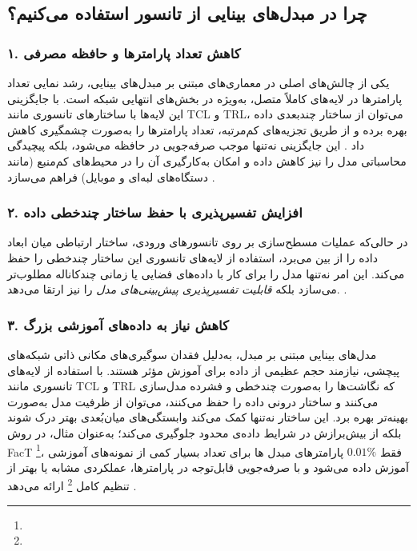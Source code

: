 \subsection{چرا در مبدل‌های بینایی از تانسور استفاده می‌کنیم؟}

\subsubsection{۱. \textbf{کاهش تعداد پارامترها و حافظه مصرفی}}

یکی از چالش‌های اصلی در معماری‌های مبتنی بر مبدل‌های بینایی، رشد نمایی تعداد پارامترها در لایه‌های کاملاً متصل، به‌ویژه در بخش‌های انتهایی شبکه است. با جایگزینی این لایه‌ها با ساختارهای تانسوری مانند TCL و TRL، می‌توان از ساختار چندبعدی داده بهره برده و از طریق تجزیه‌های کم‌مرتبه، تعداد پارامترها را به‌صورت چشمگیری کاهش داد \cite{novikov2015tensorizing, kossaifi2017tensorcontraction, kossaifi2020tensorregression}. این جایگزینی نه‌تنها موجب صرفه‌جویی در حافظه می‌شود، بلکه پیچیدگی محاسباتی مدل را نیز کاهش داده و امکان به‌کارگیری آن را در محیط‌های کم‌منبع (مانند دستگاه‌های لبه‌ای و موبایل) فراهم می‌سازد \cite{hamreras2025tensorization}.

\subsubsection{۲. \textbf{افزایش تفسیرپذیری با حفظ ساختار چندخطی داده}}

در حالی‌که عملیات مسطح‌سازی بر روی تانسورهای ورودی، ساختار ارتباطی میان ابعاد داده را از بین می‌برد، استفاده از لایه‌های تانسوری این ساختار چندخطی را حفظ می‌کند. این امر نه‌تنها مدل را برای کار با داده‌های فضایی یا زمانی چندکاناله مطلوب‌تر می‌سازد بلکه \emph{قابلیت تفسیرپذیری پیش‌بینی‌های مدل} را نیز ارتقا می‌دهد. \cite{hamreras2025tensorization}.

\subsubsection{۳. \textbf{کاهش نیاز به داده‌های آموزشی بزرگ}}

مدل‌های بینایی مبتنی بر مبدل، به‌دلیل فقدان سوگیری‌های مکانی ذاتی شبکه‌های پیچشی، نیازمند حجم عظیمی از داده برای آموزش مؤثر هستند. با استفاده از لایه‌های تانسوری مانند TCL و TRL که نگاشت‌ها را به‌صورت چندخطی و فشرده مدل‌سازی می‌کنند و ساختار درونی داده را حفظ می‌کنند، می‌توان از ظرفیت مدل به‌صورت بهینه‌تر بهره برد. این ساختار نه‌تنها کمک می‌کند وابستگی‌های میان‌بُعدی بهتر درک شوند بلکه از بیش‌برازش در شرایط داده‌ی محدود جلوگیری می‌کند؛ به‌عنوان مثال، در روش FacT \footnote{}، فقط \(0.01\%\) پارامترهای مبدل ها برای تعداد بسیار کمی از نمونه‌های آموزشی آموزش داده می‌شود و با صرفه‌جویی قابل‌توجه در پارامترها، عملکردی مشابه یا بهتر از تنظیم کامل \footnote{} ارائه می‌دهد \cite{jie2022fact}.


